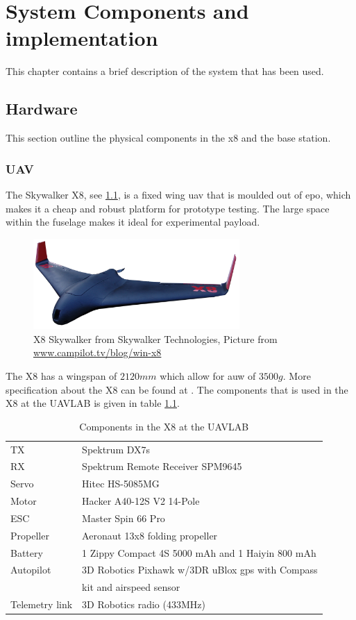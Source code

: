 
\chapter{System Components and implementation}
This chapter contains a brief description of the system that has been used.
\section{Hardware}
This section outline the physical components in the x8 and the base station.
\subsection{UAV}\label{ss:SkywalkerX8}
The Skywalker X8, see \ref{figure:skywalkerX8}, is a fixed wing \gls{uav} that is moulded out of \gls{epo}, which makes it a cheap and robust platform for prototype testing. The large space within the fuselage makes it ideal for experimental payload. 
\begin{figure}[H]
	\centering
		\includegraphics[width=0.7\textwidth]{figs/Wing-X8_white-bgd2.png}
		\caption{X8 Skywalker from Skywalker Technologies, Picture from \url{www.campilot.tv/blog/win-x8}}
		\label{figure:skywalkerX8}
\end{figure}
The X8 has a wingspan of $2120mm$ which allow for \gls{auw} of $3500g$. More specification about the X8 can be found at \citep{KlausenX8}. The components that is used in the X8 at the UAVLAB is given in table \ref{tb:X8Components}.
\begin{table}[H]
\begin{center}
\begin{tabular}{l l}
TX & Spektrum DX7s \\
RX & Spektrum Remote Receiver SPM9645 \\
Servo & Hitec HS-5085MG \\
Motor & Hacker A40-12S V2 14-Pole \\
ESC & Master Spin 66 Pro \\
Propeller & Aeronaut 13x8 folding propeller \\
Battery & 1 Zippy Compact 4S 5000 mAh and 1 Haiyin 800 mAh \\
Autopilot & 3D Robotics Pixhawk w/3DR uBlox \gls{gps} with Compass\\& kit and airspeed sensor \\
Telemetry link & 3D Robotics radio (433MHz)
\end{tabular}
\end{center}
\caption{Components in the X8 at the UAVLAB}
\label{tb:X8Components}
\end{table}
